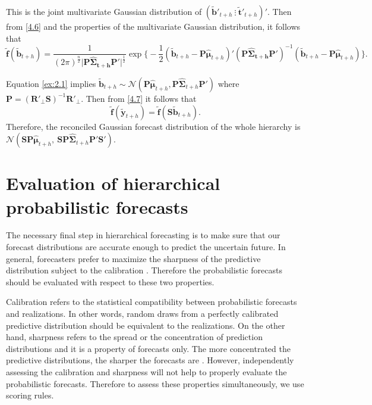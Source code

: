 \documentclass[a4paper, 11pt]{article}
\begin{document}
This is the joint multivariate Gaussian distribution of $(\tilde{\bm{b}}'_{t+h} ~ \vdots~ \tilde{\bm{t}}'_{t+h})'$. Then from \eqref{4.6} and the properties of the multivariate Gaussian distribution, it follows that
\begin{equation}\label{ex:2.1}
\tilde{\bm{f}}(\tilde{\bm{b}}_{t+h})=\frac{1}{(2\pi)^{\frac{n}{2}}\Big|\bm{P}\bm{\hat{\Sigma}_{t+h}}\bm{P}'\Big|^{\frac{1}{2}}}
\exp \Big\{-\frac{1}{2} (\tilde{\bm{b}}_{t+h} - \bm{P}\bm{\hat{\mu}}_{t+h})' (\bm{P}\bm{\hat{\Sigma}_{t+h}}\bm{P}')^{-1}(\tilde{\bm{b}}_{t+h} - \bm{P}\bm{\hat{\mu}}_{t+h}) \Big\}.
\end{equation}

Equation \eqref{ex:2.1} implies $\tilde{\bm{b}}_{t+h} \sim \mathscr{N}(\bm{P}\bm{\hat{\mu}}_{t+h}, \bm{P}\hat{\bm{\Sigma}}_{t+h}\bm{P}')$ where $\bm{P} = (\bm{R}'_\bot \bm{S})^{-1}\bm{R}'_\bot$. Then from \eqref{4.7} it follows that
\begin{equation}
\tilde{\bm{f}}(\tilde{\bm{y}}_{t+h})=\tilde{\bm{f}}(\bm{S}\tilde{\bm{b}}_{t+h}).
\end{equation}
Therefore, the reconciled Gaussian forecast distribution of the whole hierarchy is\\
$\mathscr{N}(\bm{SP}\bm{\hat{\mu}}_{t+h},~ \bm{SP}\hat{\bm{\Sigma}}_{t+h}\bm{P}'\bm{S}')$.

\section{Evaluation of hierarchical probabilistic forecasts}\label{sec:evaluation}

The necessary final step in hierarchical forecasting is to make sure that our forecast distributions are accurate enough to predict the uncertain future. In general, forecasters prefer to maximize the sharpness of the predictive distribution subject to the calibration \citep{Gneiting2014}. Therefore the probabilistic forecasts should be evaluated with respect to these two properties.

Calibration refers to the statistical compatibility between probabilistic forecasts and realizations. In other words, random draws from a perfectly calibrated predictive distribution should be equivalent to the realizations. On the other hand, sharpness refers to the spread or the concentration of prediction distributions and it is a property of forecasts only. The more concentrated the predictive distributions, the sharper the forecasts are \citep{Gneiting2008}. However, independently assessing the calibration and sharpness will not help to properly evaluate the probabilistic forecasts. Therefore to assess these properties simultaneously, we use scoring rules.
\end{document}
